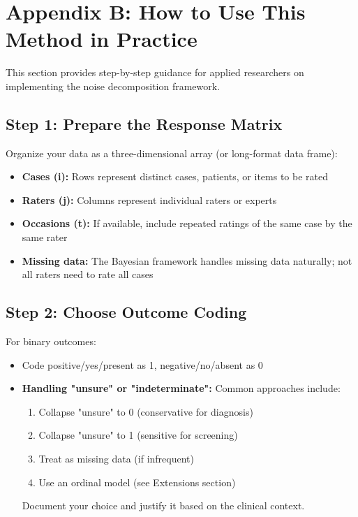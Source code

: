 \section*{Appendix B: How to Use This Method in Practice}\label{section-practical-guide}

This section provides step-by-step guidance for applied researchers on implementing the noise decomposition framework.

\subsection*{Step 1: Prepare the Response Matrix}

Organize your data as a three-dimensional array (or long-format data frame):
\begin{itemize}
    \item \textbf{Cases (i):} Rows represent distinct cases, patients, or items to be rated
    \item \textbf{Raters (j):} Columns represent individual raters or experts
    \item \textbf{Occasions (t):} If available, include repeated ratings of the same case by the same rater
    \item \textbf{Missing data:} The Bayesian framework handles missing data naturally; not all raters need to rate all cases
\end{itemize}

\subsection*{Step 2: Choose Outcome Coding}

For binary outcomes:
\begin{itemize}
    \item Code positive/yes/present as 1, negative/no/absent as 0
    \item \textbf{Handling "unsure" or "indeterminate":} Common approaches include:
    \begin{enumerate}
        \item Collapse "unsure" to 0 (conservative for diagnosis)
        \item Collapse "unsure" to 1 (sensitive for screening)
        \item Treat as missing data (if infrequent)
        \item Use an ordinal model (see Extensions section)
    \end{enumerate}
    Document your choice and justify it based on the clinical context.
\end{itemize}

